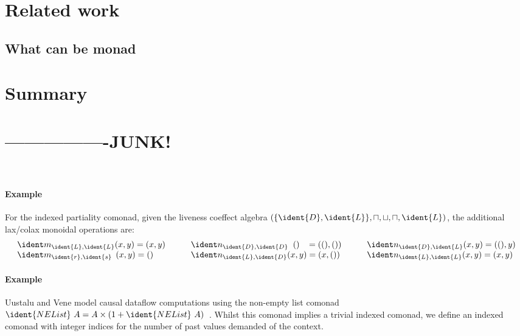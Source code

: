 \section{Related work}

\subsection{What can be monad}
\label{sec:flat-related-monads}


\section{Summary}

\section{----------------JUNK!}





~
\newpage
~



\paragraph{Example}
For the indexed partiality comonad, given the liveness coeffect
algebra $(\{\ident{D}, \ident{L}\}, \sqcap, \sqcup, \sqcap, \ident{L})$,
the additional lax/colax monoidal operations are:
\begin{align*}
\begin{array}{lll}
\cmerge_{\ident{L}, \ident{L}} (x, y) = (x, y) 
  \quad\quad& \csplit_{\ident{D}, \ident{D}} \;\; () \;\;\; = ((), ())
  \quad\quad& \csplit_{\ident{D}, \ident{L}} (x, y) = ((), y) \\
\cmerge_{\ident{r}, \ident{s}} \;\,(x, y) = () 
  & \csplit_{\ident{L}, \ident{D}} (x, y) = (x, ())
  & \csplit_{\ident{L}, \ident{L}} (x, y) = (x, y)
\end{array}
\end{align*}

\paragraph{Example}
Uustalu and Vene model causal dataflow computations using the
non-empty list comonad $\ident{NEList}~A = A \times (1 +
\ident{NEList}~A)$~\cite{comonads-notions}.  Whilst this comonad
implies a trivial indexed comonad, we define an indexed comonad with
integer indices for the number of past values demanded of the context.

